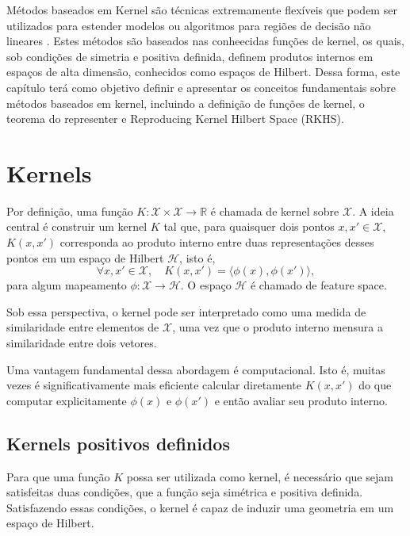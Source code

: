 \noindent Métodos baseados em Kernel são técnicas extremamente flexíveis que podem ser utilizados
para estender modelos ou algoritmos para regiões de decisão não lineares \cite{mohri2018foundations}. Estes métodos
são baseados nas conheecidas funções de kernel, os quais, sob condições de simetria e positiva definida, definem
produtos internos em espaços de alta dimensão, conhecidos como espaços de Hilbert. Dessa forma, este capítulo
terá como objetivo definir e apresentar os conceitos fundamentais sobre métodos baseados em kernel,
incluindo a definição de funções de kernel, o teorema do representer e Reproducing Kernel Hilbert
Space (RKHS).

\section{Kernels}

Por definição, uma função $K: \mathcal{X} \times \mathcal{X} \to \mathbb{R}$ é chamada de kernel sobre
$\mathcal{X}$.
A ideia central é construir um kernel $K$ tal que, para quaisquer dois pontos $x, x' \in \mathcal{X}$, $K(x, x')$
corresponda ao produto interno entre duas representações desses pontos em um espaço de Hilbert
$\mathcal{H}$, isto é,
\begin{equation}
\forall x, x' \in \mathcal{X}, \quad K(x,x') = \langle \phi(x), \phi(x') \rangle,
\end{equation}
para algum mapeamento $\phi: \mathcal{X} \to \mathcal{H}$. O espaço $\mathcal{H}$ é chamado de
feature space.

Sob essa perspectiva, o kernel pode ser interpretado como uma medida de similaridade entre elementos
de $\mathcal{X}$, uma vez que o produto interno mensura a similaridade entre dois vetores.

Uma vantagem fundamental dessa abordagem é computacional. Isto é, muitas vezes é significativamente mais eficiente
calcular diretamente $K(x,x')$ do que computar explicitamente $\phi(x)$ e $\phi(x')$ e então avaliar
seu produto interno.

\subsection{Kernels positivos definidos}

Para que uma função $K$ possa ser utilizada como kernel, é necessário que sejam satisfeitas duas condições, que
a função seja simétrica e positiva definida. Satisfazendo essas condições, o kernel é capaz de induzir uma geometria
em um espaço de Hilbert.

